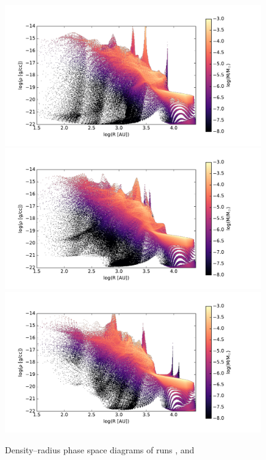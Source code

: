 \begin{figure}[!htb]
 \centering
 \includegraphics[width=0.99\textwidth]{Figures/var_rt_larson_plots/rho_R_hist_n100c10}
 \includegraphics[width=0.99\textwidth]{Figures/var_rt_larson_plots/rho_R_hist_n10c10}
 \includegraphics[width=0.99\textwidth]{Figures/var_rt_larson_plots/rho_R_hist_n1c10}
 \captionsetup{justification=justified,singlelinecheck=false,width=\linewidth}
 \decoRule
 \caption[ $\rho$--R phase diagrams]{Density--radius phase space diagrams of runs ,  and }
\label{fig:c10.0_r_R_larson}
\end{figure}
\FloatBarrier


